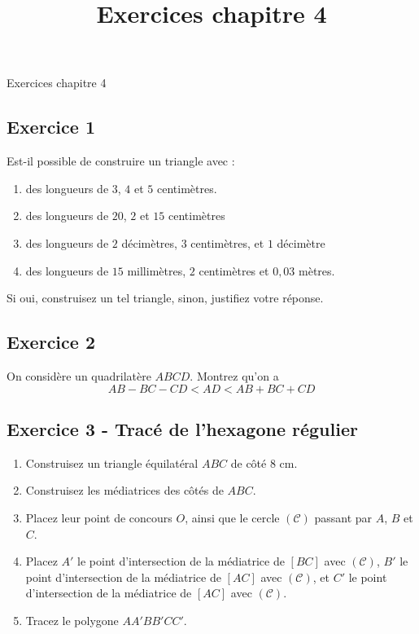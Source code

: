 \documentclass[14 pt]{extarticle}
\title{Exercices chapitre 4}
\date{}
\theoremstyle{plain}
\begin{document}
\begin{center}{\Large Exercices chapitre 4}\\ 
 \end{center}
 \subsection*{Exercice 1}
  
 Est-il possible de construire un triangle avec : 
 
 \begin{enumerate}
 \item des longueurs de $3$, $4$ et $5$ centimètres.
 \item des longueurs de $20$, $2$ et $15$ centimètres
 \item des longueurs de $2$ décimètres, $3$ centimètres, et $1$ décimètre
 \item des longueurs de $15$ millimètres, $2$ centimètres et $0,03$ mètres.
 \end{enumerate}
 Si oui, construisez un tel triangle, sinon, justifiez votre réponse. 


 \subsection*{Exercice 2}
 
 
On considère un quadrilatère $ABCD$. Montrez qu'on a \[ AB - BC - CD < AD < AB + BC + CD\] 


\subsection*{Exercice 3 - Tracé de l'hexagone régulier}

\begin{enumerate}

\item Construisez un triangle équilatéral $ABC$ de côté $8$ cm. 
\item Construisez les médiatrices des côtés de $ABC$.
\item Placez leur point de concours $O$, ainsi que le cercle $(\mathcal C)$ passant par $A$, $B$ et $C$. 
\item Placez $A'$ le point d'intersection de la médiatrice de $[BC]$ avec $(\mathcal C)$, $B'$ le point d'intersection de la médiatrice de $[AC]$ avec $(\mathcal C)$, et $C'$ le point d'intersection de la médiatrice de $[AC]$ avec $(\mathcal C)$.
\item Tracez le polygone $AA'BB'CC'$. 
\end{enumerate}
\end{document}
